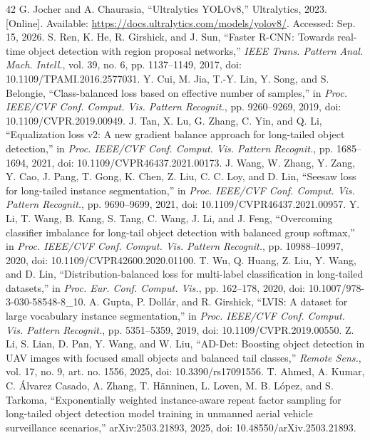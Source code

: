 \documentclass[journal]{IEEEtran}
\begin{document}
\begin{thebibliography}{42}
 G. Jocher and A. Chaurasia, ``Ultralytics YOLOv8,'' Ultralytics, 2023. [Online]. Available: \url{https://docs.ultralytics.com/models/yolov8/}. Accessed: Sep. 15, 2026.
 S. Ren, K. He, R. Girshick, and J. Sun, ``Faster R-CNN: Towards real-time object detection with region proposal networks,'' \emph{IEEE Trans. Pattern Anal. Mach. Intell.}, vol. 39, no. 6, pp. 1137--1149, 2017, doi: 10.1109/TPAMI.2016.2577031.
 Y. Cui, M. Jia, T.-Y. Lin, Y. Song, and S. Belongie, ``Class-balanced loss based on effective number of samples,'' in \emph{Proc. IEEE/CVF Conf. Comput. Vis. Pattern Recognit.}, pp. 9260--9269, 2019, doi: 10.1109/CVPR.2019.00949.
 J. Tan, X. Lu, G. Zhang, C. Yin, and Q. Li, ``Equalization loss v2: A new gradient balance approach for long-tailed object detection,'' in \emph{Proc. IEEE/CVF Conf. Comput. Vis. Pattern Recognit.}, pp. 1685--1694, 2021, doi: 10.1109/CVPR46437.2021.00173.
 J. Wang, W. Zhang, Y. Zang, Y. Cao, J. Pang, T. Gong, K. Chen, Z. Liu, C. C. Loy, and D. Lin, ``Seesaw loss for long-tailed instance segmentation,'' in \emph{Proc. IEEE/CVF Conf. Comput. Vis. Pattern Recognit.}, pp. 9690--9699, 2021, doi: 10.1109/CVPR46437.2021.00957.
 Y. Li, T. Wang, B. Kang, S. Tang, C. Wang, J. Li, and J. Feng, ``Overcoming classifier imbalance for long-tail object detection with balanced group softmax,'' in \emph{Proc. IEEE/CVF Conf. Comput. Vis. Pattern Recognit.}, pp. 10988--10997, 2020, doi: 10.1109/CVPR42600.2020.01100.
 T. Wu, Q. Huang, Z. Liu, Y. Wang, and D. Lin, ``Distribution-balanced loss for multi-label classification in long-tailed datasets,'' in \emph{Proc. Eur. Conf. Comput. Vis.}, pp. 162--178, 2020, doi: 10.1007/978-3-030-58548-8\_10.
 A. Gupta, P. Dollár, and R. Girshick, ``LVIS: A dataset for large vocabulary instance segmentation,'' in \emph{Proc. IEEE/CVF Conf. Comput. Vis. Pattern Recognit.}, pp. 5351--5359, 2019, doi: 10.1109/CVPR.2019.00550.
 Z. Li, S. Lian, D. Pan, Y. Wang, and W. Liu, ``AD-Det: Boosting object detection in UAV images with focused small objects and balanced tail classes,'' \emph{Remote Sens.}, vol. 17, no. 9, art. no. 1556, 2025, doi: 10.3390/rs17091556.
 T. Ahmed, A. Kumar, C. Álvarez Casado, A. Zhang, T. Hänninen, L. Loven, M. B. López, and S. Tarkoma, ``Exponentially weighted instance-aware repeat factor sampling for long-tailed object detection model training in unmanned aerial vehicle surveillance scenarios,'' arXiv:2503.21893, 2025, doi: 10.48550/arXiv.2503.21893.

\end{thebibliography}
\end{document}
